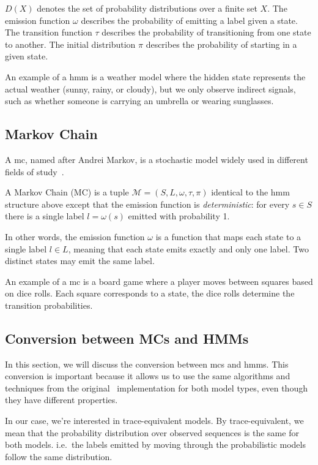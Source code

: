 $D(X)$ denotes the set of probability distributions over a finite set $X$.
The emission function $\omega$ describes the probability of emitting a label given a state.
The transition function $\tau$ describes the probability of transitioning from one state to another.
The initial distribution $\pi$ describes the probability of starting in a given state.

An example of a \gls{hmm} is a weather model where the hidden state represents the actual weather (sunny, rainy, or cloudy), but we only observe indirect signals, such as whether someone is carrying an umbrella or wearing sunglasses.

\subsection{Markov Chain}\label{subsec:mc}
A \acrfull{mc}, named after Andrei Markov, is a stochastic model widely used in different fields of study~\cite{Rabiner89}.


\begin{definition}
    A Markov Chain (MC) is a tuple $\mathcal{M} = (S, L, \omega, \tau, \pi)$ identical to the \gls{hmm} structure above except that the emission function is \emph{deterministic}: for every $s\in S$ there is a single label
    $l=\omega(s)$ emitted with probability 1.
\end{definition}


In other words, the emission function $\omega$ is a function that maps each state to a single label $l \in L$, meaning that each state emits exactly and only one label.
Two distinct states may emit the same label.

An example of a \gls{mc} is a board game where a player moves between squares based on dice rolls.
Each square corresponds to a state, the dice rolls determine the transition probabilities.

\subsection{Conversion between MCs and HMMs}\label{subsec:mc_hmm_conversion}
In this section, we will discuss the conversion between \glspl{mc} and \glspl{hmm}.
This conversion is important because it allows us to use the same algorithms and techniques from the original \Cupaal\ implementation for both model types, even though they have different properties.

In our case, we're interested in trace-equivalent models.
By trace-equivalent, we mean that the probability distribution over observed sequences is the same for both models.
i.e.\ the labels emitted by moving through the probabilistic models follow the same distribution.

